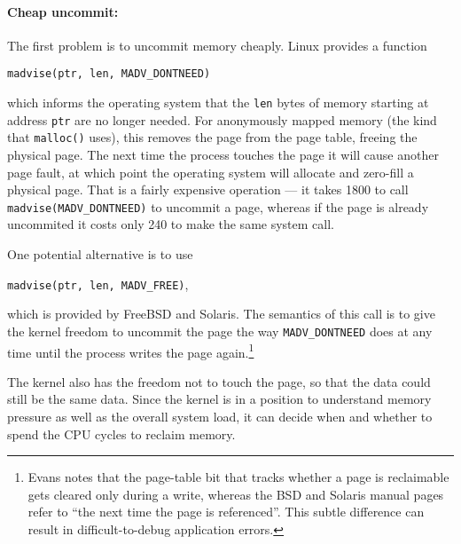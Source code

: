 \documentclass[natbib,sort&compress,10pt]{sigplanconf}
\newcommand{\code}[1]{\texttt{#1}}
\newcommand{\ns}[1]{\unit{#1}\nano\second{}}
\begin{document}
{\paragraph{Cheap uncommit:}} The first problem is to uncommit memory
cheaply.  Linux provides a function
\begin{center}
\code{madvise(ptr, len, MADV\_DONTNEED)}
\end{center}
which informs the operating system that the \code{len} bytes of memory
starting at address \code{ptr} are no longer needed.  For anonymously
mapped memory (the kind that \code{malloc()} uses), this removes the
page from the page table, freeing the physical page.  The next time
the process touches the page it will cause another page fault, at
which point the operating system will allocate and zero-fill a
physical page.  That is a fairly expensive operation --- it takes
\ns{1800} to call \code{madvise(MADV\_DONTNEED)} to uncommit a page,
whereas if the page is already uncommited it costs only \ns{240} to
make the same system call.

One potential alternative is to use
\begin{center}
\code{madvise(ptr, len, MADV\_FREE)},
\end{center}
which is provided by FreeBSD and Solaris.  The semantics of this call
is to give the kernel freedom to uncommit the page the way
\code{MADV\_DONTNEED} does at any time until the process writes the
page again.\footnote{Evans notes \cite{Evans15-personal-communication}
  that the page-table bit that tracks whether a page is reclaimable
  gets cleared only during a write, whereas the BSD and Solaris manual
  pages refer to ``the next time the page is referenced''.  This
  subtle difference can result in difficult-to-debug application
  errors.}

  The kernel also has the freedom not to touch the page, so
that the data could still be the same data.  Since the kernel is in a
position to understand memory pressure as well as the overall system
load, it can decide when and whether to spend the CPU cycles to
reclaim memory.

\end{document}
